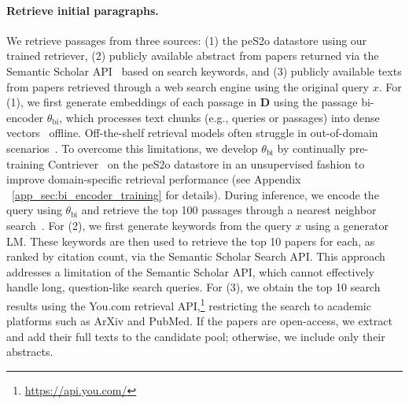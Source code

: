 \paragraph{Retrieve initial paragraphs.} 
We retrieve passages from three sources: (1) the peS2o datastore using our trained retriever, (2) publicly available abstract from papers returned via the Semantic Scholar API~\citep{Kinney2023TheSS} based on search keywords, and (3) publicly available texts from papers retrieved through a web search engine using the original query $x$. 
For (1), we first generate embeddings of each passage in $\mathbf{D}$ using the passage bi-encoder $\theta_\text{bi}$, which processes text chunks (e.g., queries or passages) into dense vectors~\citep{karpukhin2020dense} offline. 
Off-the-shelf retrieval models often struggle in out-of-domain scenarios~\citep{thakur2021beir}. 
To overcome this limitations, we develop $\theta_\text{bi}$ by continually pre-training Contriever~\citep{izacard2021towards} on the peS2o datastore in an unsupervised fashion to improve domain-specific retrieval performance (see Appendix ~\ref{app_sec:bi_encoder_training} for details). 
During inference, we encode the query using $\theta_\text{bi}$ and retrieve the top 100 passages through a nearest neighbor search~\citep{karpukhin2020dense}. 
For (2), we first generate keywords from the query $x$ using a generator LM. These keywords are then used to retrieve the top 10 papers for each, as ranked by citation count, via the Semantic Scholar Search API. 
This approach addresses a limitation of the Semantic Scholar API, which cannot effectively handle long, question-like search queries. 
For (3), we obtain the top 10 search results using the You.com retrieval API,\footnote{\url{https://api.you.com/}} restricting the search to academic platforms such as ArXiv and PubMed. If the papers are open-access, we extract and add their full texts to the candidate pool; otherwise, we include only their abstracts. 


